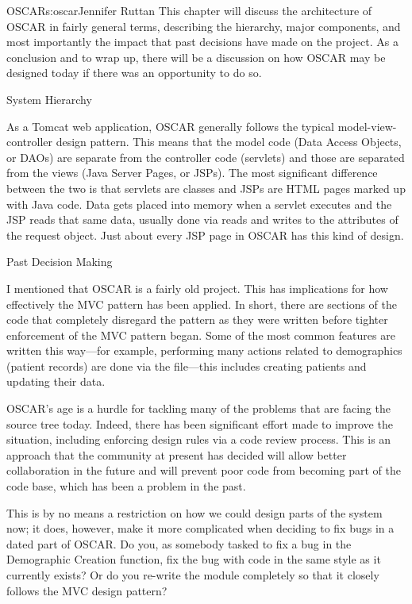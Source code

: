 \begin{aosachapter}{OSCAR}{s:oscar}{Jennifer Ruttan}
This chapter will discuss the architecture of OSCAR in fairly general
terms, describing the hierarchy, major components, and most
importantly the impact that past decisions have made on the
project. As a conclusion and to wrap up, there will be a discussion on
how OSCAR may be designed today if there was an opportunity to do so.

\begin{aosasect1}{System Hierarchy}

As a Tomcat web application, OSCAR generally follows the typical
model-view-controller design pattern. This means that the model code
(Data Access Objects, or DAOs) are separate from the controller code
(servlets) and those are separated from the views (Java Server Pages,
or JSPs). The most significant difference between the two is that
servlets are classes and JSPs are HTML pages marked up with Java
code. Data gets placed into memory when a servlet executes and the JSP
reads that same data, usually done via reads and writes to the
attributes of the request object. Just about every JSP page in OSCAR
has this kind of design.

\end{aosasect1}

\begin{aosasect1}{Past Decision Making}

I mentioned that OSCAR is a fairly old project. This has implications
for how effectively the MVC pattern has been applied. In short, there
are sections of the code that completely disregard the pattern as they
were written before tighter enforcement of the MVC pattern began. Some
of the most common features are written this way---for example,
performing many actions related to demographics (patient records) are
done via the  file---this includes
creating patients and updating their data.

OSCAR's age is a hurdle for tackling many of the problems that are
facing the source tree today. Indeed, there has been significant
effort made to improve the situation, including enforcing design rules
via a code review process. This is an approach that the community at
present has decided will allow better collaboration in the future and
will prevent poor code from becoming part of the code base, which has
been a problem in the past.

This is by no means a restriction on how we could design parts of the
system now; it does, however, make it more complicated when deciding
to fix bugs in a dated part of OSCAR. Do you, as somebody tasked to
fix a bug in the Demographic Creation function, fix the bug with code
in the same style as it currently exists? Or do you re-write the
module completely so that it closely follows the MVC design pattern?


\end{aosasect1}
\end{aosachapter}
